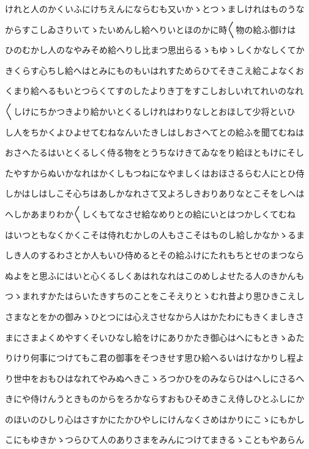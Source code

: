 \documentclass[a4paper,11pt,landscape]{ltjtarticle}
\begin{document}
けれと人のかくいふにけちえんにならむも又いかゝとつゝましけれはものうな
\par\medskip
からすこしゐさりいてゝたいめんし給へりいとほのかに時〱物の給ふ御けは
\par\medskip
ひのむかし人のなやみそめ給へりし比まつ思出らるゝもゆゝしくかなしくてか
\par\medskip
きくらす心ちし給へはとみにものもいはれすためらひてそきこえ給こよなくお
\par\medskip
くまり給へるもいとつらくてすのしたよりき丁をすこしおしいれてれいのなれ
\par\medskip
〱しけにちかつきより給かいとくるしけれはわりなしとおほして少将といひ
\par\medskip
し人をちかくよひよせてむねなんいたきしはしおさへてとの給ふを聞てむねは
\par\medskip
おさへたるはいとくるしく侍る物をとうちなけきてゐなをり給ほともけにそし
\par\medskip
たやすからぬいかなれはかくしもつねになやましくはおほさるらむ人にとひ侍
\par\medskip
しかはしはしこそ心ちはあしかなれさて又よろしきおりありなとこそをしへは
\par\medskip
へしかあまりわか〱しくもてなさせ給なめりとの給にいとはつかしくてむね
\par\medskip
はいつともなくかくこそは侍れむかしの人もさこそはものし給しかなかゝるま
\par\medskip
しき人のするわさとか人もいひ侍めるとその給ふけにたれもちとせのまつなら
\par\medskip
ぬよをと思ふにはいと心くるしくあはれなれはこのめしよせたる人のきかんも
\par\medskip
つゝまれすかたはらいたきすちのことをこそえりとゝむれ昔より思ひきこえし
\par\medskip
さまなとをかの御みゝひとつには心えさせなから人はかたわにもきくましきさ
\par\medskip
まにさまよくめやすくそいひなし給をけにありかたき御心はへにもときゝゐた
\par\medskip
りけり何事につけてもこ君の御事をそつきせす思ひ給へるいはけなかりし程よ
\par\medskip
り世中をおもひはなれてやみぬへきこゝろつかひをのみならひはへしにさるへ
\par\medskip
きにや侍けんうときものからをろかならすおもひそめきこえ侍しひとふしにか
\par\medskip
のほいのひしり心はさすかにたかひやしにけんなくさめはかりにこゝにもかし
\par\medskip
こにもゆきかゝつらひて人のありさまをみんにつけてまきるゝこともやあらん
\end{document}
